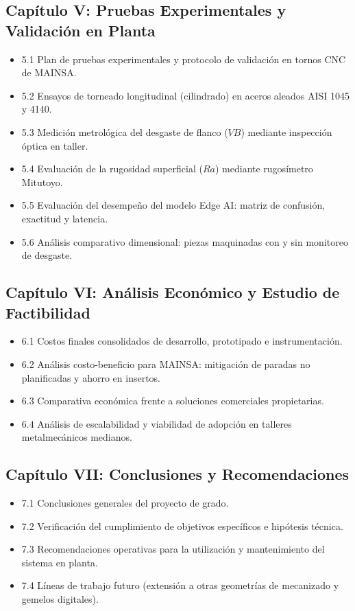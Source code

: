 \subsection*{Capítulo V: Pruebas Experimentales y Validación en Planta}
\begin{itemize}
    \item 5.1 Plan de pruebas experimentales y protocolo de validación en tornos CNC de MAINSA.
    \item 5.2 Ensayos de torneado longitudinal (cilindrado) en aceros aleados AISI 1045 y 4140.
    \item 5.3 Medición metrológica del desgaste de flanco ($VB$) mediante inspección óptica en taller.
    \item 5.4 Evaluación de la rugosidad superficial ($Ra$) mediante rugosímetro Mitutoyo.
    \item 5.5 Evaluación del desempeño del modelo Edge AI: matriz de confusión, exactitud y latencia.
    \item 5.6 Análisis comparativo dimensional: piezas maquinadas con y sin monitoreo de desgaste.
\end{itemize}

\subsection*{Capítulo VI: Análisis Económico y Estudio de Factibilidad}
\begin{itemize}
    \item 6.1 Costos finales consolidados de desarrollo, prototipado e instrumentación.
    \item 6.2 Análisis costo-beneficio para MAINSA: mitigación de paradas no planificadas y ahorro en insertos.
    \item 6.3 Comparativa económica frente a soluciones comerciales propietarias.
    \item 6.4 Análisis de escalabilidad y viabilidad de adopción en talleres metalmecánicos medianos.
\end{itemize}

\subsection*{Capítulo VII: Conclusiones y Recomendaciones}
\begin{itemize}
    \item 7.1 Conclusiones generales del proyecto de grado.
    \item 7.2 Verificación del cumplimiento de objetivos específicos e hipótesis técnica.
    \item 7.3 Recomendaciones operativas para la utilización y mantenimiento del sistema en planta.
    \item 7.4 Líneas de trabajo futuro (extensión a otras geometrías de mecanizado y gemelos digitales).
\end{itemize}
